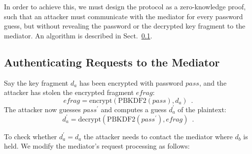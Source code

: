 \documentclass{llncs}
\begin{document}
In order to achieve this, we must design the protocol as a zero-knowledge proof, such that an
attacker must communicate with the mediator for every password guess, but without revealing the
password or the decrypted key fragment to the mediator. An algorithm is described in
Sect.~\ref{sec:mediator-auth}.

\subsection{Authenticating Requests to the Mediator}\label{sec:mediator-auth}

Say the key fragment $d_a$ has been encrypted with password $\mathit{pass}$, and the attacker has
stolen the encrypted fragment $\mathit{efrag}$:
\begin{equation}
\mathit{efrag} = \mathrm{encrypt}(\mathrm{PBKDF2}(\mathit{pass}), d_a) \enspace.
\end{equation}
The attacker now guesses $\mathit{pass}^\prime$ and computes a guess $d_a^\prime$ of the plaintext:
\begin{equation}
d_a^\prime = \mathrm{decrypt}(\mathrm{PBKDF2}(\mathit{pass}^\prime), \mathit{efrag}) \enspace.
\end{equation}

To check whether $d_a^\prime = d_a$ the attacker needs to contact the mediator where $d_b$ is held.
We modify the mediator's request processing as follows:
\end{document}
